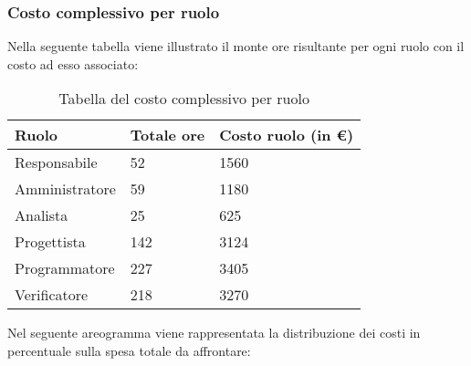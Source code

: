 \subsubsection{Costo complessivo per ruolo}
Nella seguente tabella viene illustrato il monte ore risultante per ogni ruolo con il costo ad esso associato:
{
\renewcommand{\arraystretch}{2}
\begin{longtable}{ C{3cm} C{2cm} C{4cm}}
\caption{Tabella del costo complessivo per ruolo}\\
\rowcolor{\primaryColor}

\textcolor{\secondaryColor}{\textbf{Ruolo}} & 
\textcolor{\secondaryColor}{\textbf{Totale ore}} & 
\textcolor{\secondaryColor}{\textbf{Costo ruolo (in \euro{})}}\\	
\endhead
        
Responsabile   &  52 & 1560 \\
Amministratore &  59 & 1180 \\
Analista       &  25 & 625 \\
Progettista    &  142 & 3124 \\
Programmatore  &  227 & 3405 \\
Verificatore   &  218 & 3270 \\
        	
\end{longtable}
}


Nel seguente areogramma viene rappresentata la distribuzione dei costi in percentuale sulla spesa totale da affrontare:
\begin{center}
\end{center}

